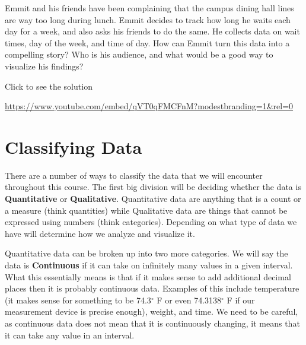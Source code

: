 \documentclass[
  letterpaper,
  DIV=11,
  numbers=noendperiod]{scrreprt}
\begin{document}
\begin{tcolorbox}[enhanced jigsaw, colframe=quarto-callout-tip-color-frame, colback=white, breakable, rightrule=.15mm, title=\textcolor{quarto-callout-tip-color}{\faLightbulb}\hspace{0.5em}{Try it Out}, bottomtitle=1mm, toptitle=1mm, titlerule=0mm, left=2mm, coltitle=black, colbacktitle=quarto-callout-tip-color!10!white, leftrule=.75mm, opacitybacktitle=0.6, bottomrule=.15mm, opacityback=0, arc=.35mm, toprule=.15mm]

Emmit and his friends have been complaining that the campus dining hall
lines are way too long during lunch. Emmit decides to track how long he
waits each day for a week, and also asks his friends to do the same. He
collects data on wait times, day of the week, and time of day. How can
Emmit turn this data into a compelling story? Who is his audience, and
what would be a good way to visualize his findings?

Click to see the solution

\url{https://www.youtube.com/embed/qVT0qFMCFnM?modestbranding=1&rel=0}

\end{tcolorbox}

\section{Classifying Data}\label{classifying-data}

There are a number of ways to classify the data that we will encounter
throughout this course. The first big division will be deciding whether
the data is \textbf{Quantitative} or \textbf{Qualitative}. Quantitative
data are anything that is a count or a measure (think quantities) while
Qualitative data are things that cannot be expressed using numbers
(think categories). Depending on what type of data we have will
determine how we analyze and visualize it.

Quantitative data can be broken up into two more categories. We will say
the data is \textbf{Continuous} if it can take on infinitely many values
in a given interval. What this essentially means is that if it makes
sense to add additional decimal places then it is probably continuous
data. Examples of this include temperature (it makes sense for something
to be 74.3\(^\circ\) F or even 74.3138\(^\circ\) F if our measurement
device is precise enough), weight, and time. We need to be careful, as
continuous data does not mean that it is continuously changing, it means
that it can take any value in an interval.
\end{document}
